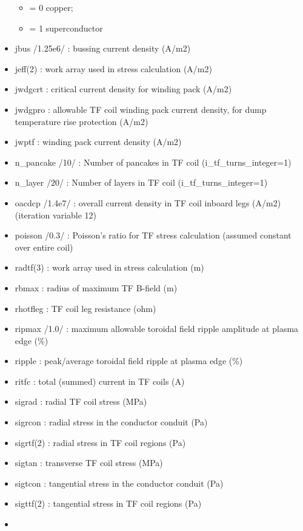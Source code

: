 \documentclass[]{article}
\begin{document}
\begin{itemize}
  \begin{itemize}
  \itemsep1pt\parskip0pt
  \item
    = 0 copper;
  \item
    = 1 superconductor
  \end{itemize}
\item
  jbus /1.25e6/ : bussing current density (A/m2)
\item
  jeff(2) : work array used in stress calculation (A/m2)
\item
  jwdgcrt : critical current density for winding pack (A/m2)
\item
  jwdgpro : allowable TF coil winding pack current density, for dump
  temperature rise protection (A/m2)
\item
  jwptf : winding pack current density (A/m2)
\item
  n\_pancake /10/ : Number of pancakes in TF coil
  (i\_tf\_turns\_integer=1)
\item
  n\_layer /20/ : Number of layers in TF coil (i\_tf\_turns\_integer=1)
\item
  oacdcp /1.4e7/ : overall current density in TF coil inboard legs
  (A/m2) (iteration variable 12)
\item
  poisson /0.3/ : Poisson's ratio for TF stress calculation (assumed
  constant over entire coil)
\item
  radtf(3) : work array used in stress calculation (m)
\item
  rbmax : radius of maximum TF B-field (m)
\item
  rhotfleg : TF coil leg resistance (ohm)
\item
  ripmax /1.0/ : maximum allowable toroidal field ripple amplitude at
  plasma edge (\%)
\item
  ripple : peak/average toroidal field ripple at plasma edge (\%)
\item
  ritfc : total (summed) current in TF coils (A)
\item
  sigrad : radial TF coil stress (MPa)
\item
  sigrcon : radial stress in the conductor conduit (Pa)
\item
  sigrtf(2) : radial stress in TF coil regions (Pa)
\item
  sigtan : transverse TF coil stress (MPa)
\item
  sigtcon : tangential stress in the conductor conduit (Pa)
\item
  sigttf(2) : tangential stress in TF coil regions (Pa)
\item

\end{itemize}
\end{document}
